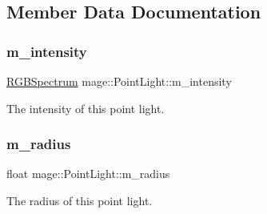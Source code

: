 \subsection{Member Data Documentation}
\hypertarget{classmage_1_1_point_light_ac021a08c4c700c3b19de5f7491a80e4f}{}\label{classmage_1_1_point_light_ac021a08c4c700c3b19de5f7491a80e4f} 
\subsubsection{\texorpdfstring{m\+\_\+intensity}{m\_intensity}}
{\footnotesize\ttfamily \hyperlink{structmage_1_1_r_g_b_spectrum}{R\+G\+B\+Spectrum} mage\+::\+Point\+Light\+::m\+\_\+intensity\hspace{0.3cm}{\ttfamily [private]}}

The intensity of this point light. \hypertarget{classmage_1_1_point_light_a04459adec2eaadc457799e4399b5df1f}{}\label{classmage_1_1_point_light_a04459adec2eaadc457799e4399b5df1f} 
\subsubsection{\texorpdfstring{m\+\_\+radius}{m\_radius}}
{\footnotesize\ttfamily float mage\+::\+Point\+Light\+::m\+\_\+radius\hspace{0.3cm}{\ttfamily [private]}}

The radius of this point light. 
